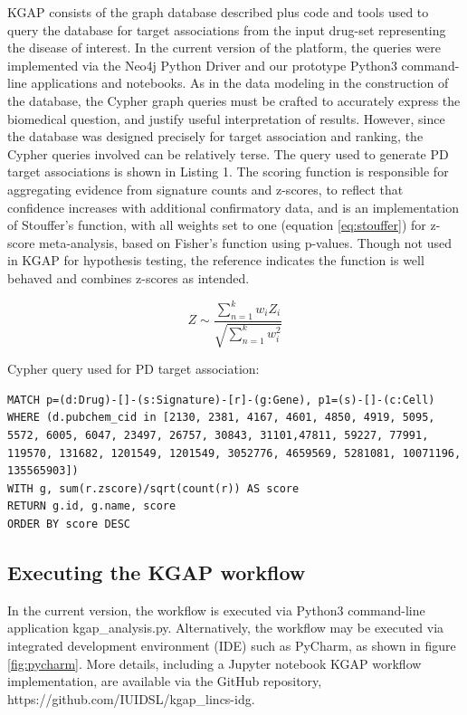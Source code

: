 KGAP consists of the graph database described plus code and tools used to query the database for target associations from the input drug-set representing the disease of interest. In the current version of the platform, the queries were implemented via the Neo4j Python Driver\cite{Neo4j_Inc_undated-ly} and our prototype Python3 command-line applications and notebooks. As in the data modeling in the construction of the database, the Cypher graph queries must be crafted to accurately express the biomedical question, and justify useful interpretation of results. However, since the database was designed precisely for target association and ranking, the Cypher queries involved can be relatively terse. The query used to generate PD target associations is shown in Listing 1. The scoring function is responsible for aggregating evidence from signature counts and z-scores, to reflect that confidence increases with additional confirmatory data, and is an implementation of Stouffer's function, with all weights set to one (equation \ref{eq:stouffer}) for z-score meta-analysis, based on Fisher's function using p-values\cite{Rosenthal1978-in}. Though not used in KGAP for hypothesis testing, the reference indicates the function is well behaved and combines z-scores as intended. 

\begin{equation}
Z \sim \frac{\sum_{n=1}^{k}w_iZ_i}{\sqrt{\sum_{n=1}^{k}w_i^2}}
\label{eq:stouffer}
\end{equation}

Cypher query used for PD target association:

\begin{lstlisting}
MATCH p=(d:Drug)-[]-(s:Signature)-[r]-(g:Gene), p1=(s)-[]-(c:Cell)
WHERE (d.pubchem_cid in [2130, 2381, 4167, 4601, 4850, 4919, 5095, 5572, 6005, 6047, 23497, 26757, 30843, 31101,47811, 59227, 77991, 119570, 131682, 1201549, 1201549, 3052776, 4659569, 5281081, 10071196, 135565903])
WITH g, sum(r.zscore)/sqrt(count(r)) AS score
RETURN g.id, g.name, score
ORDER BY score DESC
\end{lstlisting}

\subsection{Executing the KGAP workflow}

In the current version, the workflow is executed via Python3 command-line application kgap\_analysis.py. Alternatively, the workflow may be executed via integrated development environment (IDE) such as PyCharm, as shown in figure \ref{fig:pycharm}. More details, including a Jupyter notebook KGAP workflow implementation, are available via the GitHub repository, https://github.com/IUIDSL/kgap\_lincs-idg. 


